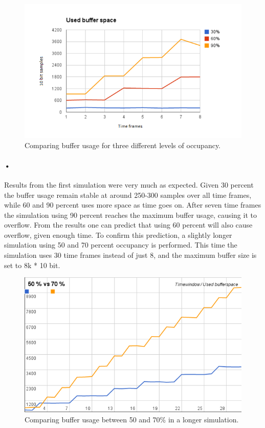 \documentclass[a4paper, 12pt, openright, twoside]{report}
\begin{document}
\begin{figure}[h!]
	\centering
		\includegraphics[width=1.0\textwidth]{images/results-flat30-60-80-8tf.png}
		\caption{Comparing buffer usage for three different levels of occupancy.}
		\label{fig:results-30-60-90}
\end{figure}

\paragraph{•} %
Results from the first simulation were very much as expected.
Given 30 percent the buffer usage remain stable at around 250-300 samples over all time frames, while 60 and 90 percent uses more space as time goes on.
After seven time frames the simulation using 90 percent reaches the maximum buffer usage, causing it to overflow.
From the results one can predict that using 60 percent will also cause overflow, given enough time.
To confirm this prediction, a slightly longer simulation using 50 and 70 percent occupancy is performed.
This time the simulation uses 30 time frames instead of just 8, and the maximum buffer size is set to 8k * 10 bit.

\begin{figure}[h!]
	\centering
		\includegraphics[width=1.0\textwidth]{images/50v70.png}
		\caption{Comparing buffer usage between 50 and 70\% in a longer simulation.}
		\label{fig:results-50-70}
\end{figure}
\end{document}
